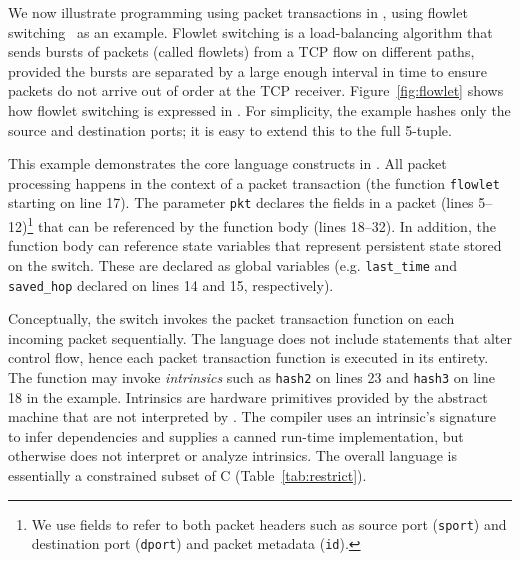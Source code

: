 We now illustrate programming using packet transactions in \pktlanguage, using
flowlet switching~\cite{flowlets} as an example. Flowlet switching is a
load-balancing algorithm that sends bursts of packets (called flowlets) from a
TCP flow on different paths, provided the bursts are separated by a large
enough interval in time to ensure packets do not arrive out of order at the TCP
receiver. Figure~\ref{fig:flowlet} shows how flowlet switching is expressed in
\pktlanguage. For simplicity, the example hashes only the source and
destination ports; it is easy to extend this to the full 5-tuple.

This example demonstrates the core language constructs in \pktlanguage. All
packet processing happens in the context of a packet transaction (the function
\texttt{flowlet} starting on line 17). %
The parameter {\tt pkt} declares the fields in a packet (lines 5--12)\footnote{We use fields
to refer to both packet headers such as source port ({\tt sport}) and destination
port ({\tt dport}) and packet metadata ({\tt id}).} that can be referenced by the function
body (lines 18--32).  In addition, the function body can reference state
variables that represent persistent state stored on the switch. These are
declared as global variables (e.g. \texttt{last\_time} and \texttt{saved\_hop}
declared on lines 14 and 15, respectively).

Conceptually, the switch invokes 
the packet transaction function on each incoming packet sequentially.
The language does not include statements that alter control flow, hence each
packet transaction function is executed in its entirety.
The function may invoke
\textit{intrinsics} such as \texttt{hash2} on lines 23 and \texttt{hash3} on
line 18 in the example.  Intrinsics are hardware primitives provided by the abstract machine
that are not interpreted by \pktlanguage. The \pktlanguage compiler uses an
intrinsic's signature to infer dependencies and supplies a canned run-time
implementation, but otherwise does not interpret or analyze intrinsics. The
overall language is essentially a constrained subset of C
(Table~\ref{tab:restrict}).

